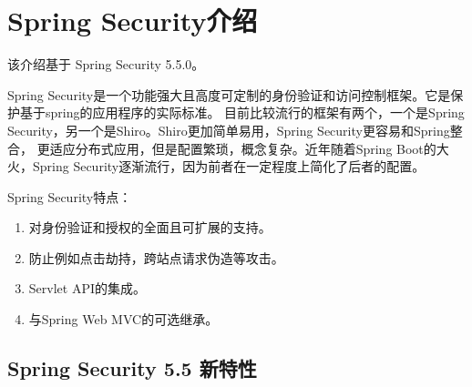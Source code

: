 \section{Spring Security介绍}

该介绍基于 Spring Security 5.5.0。

Spring Security是一个功能强大且高度可定制的身份验证和访问控制框架。它是保护基于spring的应用程序的实际标准。
目前比较流行的框架有两个，一个是Spring Security，另一个是Shiro。Shiro更加简单易用，Spring Security更容易和Spring整合，
更适应分布式应用，但是配置繁琐，概念复杂。近年随着Spring Boot的大火，Spring Security逐渐流行，因为前者在一定程度上简化了后者的配置。

Spring Security特点：
\begin{enumerate}
  \item 对身份验证和授权的全面且可扩展的支持。
  \item 防止例如点击劫持，跨站点请求伪造等攻击。
  \item Servlet API的集成。
  \item 与Spring Web MVC的可选继承。
\end{enumerate}

\subsection{Spring Security 5.5 新特性}


